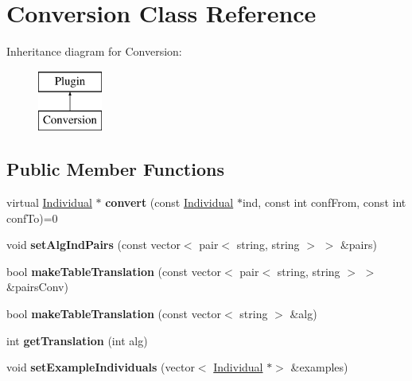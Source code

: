 \hypertarget{classConversion}{}\section{Conversion Class Reference}
\label{classConversion}
Inheritance diagram for Conversion\+:\begin{figure}[H]
\begin{center}
\leavevmode
\includegraphics[height=2.000000cm]{dc/d41/classConversion}
\end{center}
\end{figure}
\subsection*{Public Member Functions}
\begin{DoxyCompactItemize}
\item 
\mbox{\label{classConversion_a408cf455d1d4f2b1a1ba1a39d7996d11}} 
virtual \mbox{\hyperlink{classIndividual}{Individual}} $\ast$ {\bfseries convert} (const \mbox{\hyperlink{classIndividual}{Individual}} $\ast$ind, const int conf\+From, const int conf\+To)=0
\item 
\mbox{\label{classConversion_a592abda114360f2a13af39c7de4be4cc}} 
void {\bfseries set\+Alg\+Ind\+Pairs} (const vector$<$ pair$<$ string, string $>$ $>$ \&pairs)
\item 
\mbox{\label{classConversion_ae8e8874a9af676204ec4f13a5f2643c9}} 
bool {\bfseries make\+Table\+Translation} (const vector$<$ pair$<$ string, string $>$ $>$ \&pairs\+Conv)
\item 
\mbox{\label{classConversion_ac62754cf8a22c1c11591fe4260e0126e}} 
bool {\bfseries make\+Table\+Translation} (const vector$<$ string $>$ \&alg)
\item 
\mbox{\label{classConversion_aa05c692ce2bcad004aa465da169c6a34}} 
int {\bfseries get\+Translation} (int alg)
\item 
\mbox{\label{classConversion_a2fdb1bb64d67a13d628d8c5a4ca1117c}} 
void {\bfseries set\+Example\+Individuals} (vector$<$ \mbox{\hyperlink{classIndividual}{Individual}} $\ast$$>$ \&examples)
\end{DoxyCompactItemize}

